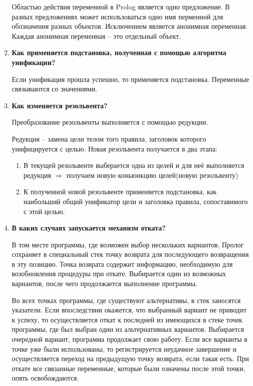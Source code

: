 \begin{enumerate}
        Областью действия переменной в Prolog является одно предложение. В разных предложениях может использоваться одно имя перменной для обозначения разных объектов. Исключением является анонимная переменная. Каждая анонимная переменная -- это отдельный объект.

    \item \textbf{Как применяется подстановка, полученная с помощью алгоритма унификации?}

        Если унификация прошла успешно, то применяется подстановка. Переменные связываются со значениями.

    \item \textbf{Как изменяется резольвента?}

        Преобразование резольвенты выполняется с помощью редукции.

        Редукция -- замена цели телом того правила, заголовок которого унифицируется с целью.
        Новая резольвента получается в два этапа:

        \begin{enumerate}
            \item В текущей резольвенте выберается одна из целей и для неё выполняется редукция $\Rightarrow$ получаем новую коньюнкцию целей(новую резольвенту)
            \item К полученной новой резольвенте применяется подстановка, как наибольший общий унификатор цели и заголовка правила, сопоставимого с этой целью.
        \end{enumerate}

    \item \textbf{В каких случаях запускается механизм отката?}

        В том месте программы, где возможен выбор нескольких вариантов, Пролог сохраняет в специальный стек точку возврата для последующего возвращения в эту позицию. Точка возврата содержит информацию, необходимую для возобновления процедуры при откате. Выбирается один из возможных вариантов, после чего продолжается выполнение программы.

Во всех точках программы, где существуют альтернативы, в стек заносятся указатели. Если впоследствии окажется, что выбранный вариант не приводит к успеху, то осуществляется откат к последней из имеющихся в стеке точек программы, где был выбран один из альтернативных вариантов. Выбирается очередной вариант, программа продолжает свою работу. Если все варианты в точке уже были использованы, то регистрируется неудачное завершение и осуществляется переход на предыдущую точку возврата, если такая есть. При откате все связанные переменные, которые были означены после этой точки, опять освобождаются.
\end{enumerate}
